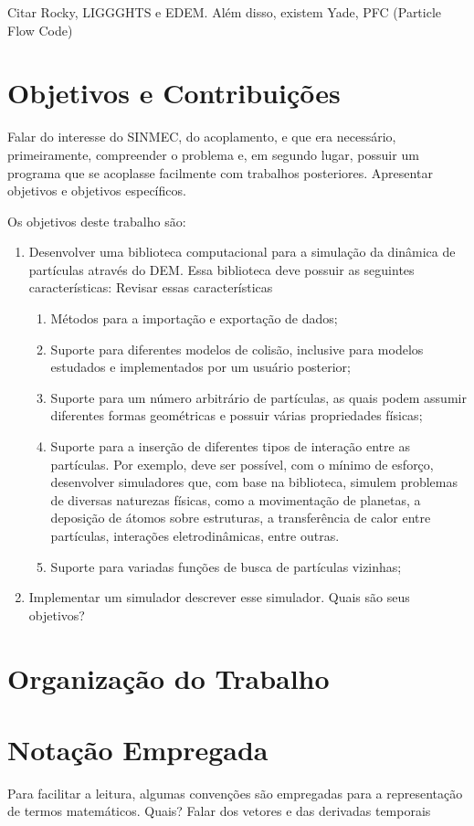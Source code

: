 \alert{Citar Rocky, LIGGGHTS e EDEM. Além disso, existem Yade, PFC (Particle Flow Code)}

\section{Objetivos e Contribuições}

\alert{Falar do interesse do SINMEC, do acoplamento, e que era necessário, primeiramente, compreender o problema e, em segundo lugar, possuir um programa que se acoplasse facilmente com trabalhos posteriores. Apresentar objetivos e objetivos específicos.}

Os objetivos deste trabalho são:
\begin{enumerate}
\item Desenvolver uma biblioteca computacional para a simulação da dinâmica de partículas através do DEM. Essa biblioteca deve possuir as seguintes características:
	\alert{Revisar essas características}
 	\begin{enumerate}
		\item Métodos para a importação e exportação de dados; 
		\item Suporte para diferentes modelos de colisão, inclusive para modelos estudados e implementados por um usuário posterior;
		\item Suporte para um número arbitrário de partículas, as quais podem assumir diferentes formas geométricas e possuir várias propriedades físicas;
        \item Suporte para a inserção de diferentes tipos de interação entre as partículas. Por exemplo, deve ser possível, com o mínimo de esforço, desenvolver simuladores que, com base na biblioteca, simulem problemas de diversas naturezas físicas, como a movimentação de planetas, a deposição de átomos sobre estruturas, a transferência de calor entre partículas, interações eletrodinâmicas, entre outras.
		\item Suporte para variadas funções de busca de partículas vizinhas;
	\end{enumerate}  
\item Implementar um simulador \alert{descrever esse simulador. Quais são seus objetivos?}
\end{enumerate}

\section{Organização do Trabalho}

\section{Notação Empregada}

Para facilitar a leitura, algumas convenções são empregadas para a representação de termos matemáticos. \alert{Quais? Falar dos vetores e das derivadas temporais}